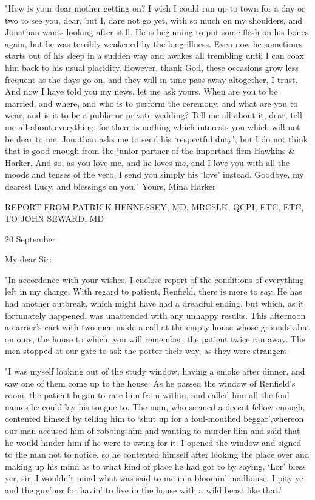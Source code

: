 "How is your dear mother getting on? I wish I could run up to town for a day or two to see you, dear, but I, dare not go yet, with so much on my shoulders, and Jonathan wants looking after still. He is beginning to put some flesh on his bones again, but he was terribly weakened by the long illness. Even now he sometimes starts out of his sleep in a sudden way and awakes all trembling until I can coax him back to his usual placidity. However, thank God, these occasions grow less frequent as the days go on, and they will in time pass away altogether, I trust. And now I have told you my news, let me ask yours. When are you to be married, and where, and who is to perform the ceremony, and what are you to wear, and is it to be a public or private wedding? Tell me all about it, dear, tell me all about everything, for there is nothing which interests you which will not be dear to me. Jonathan asks me to send his `respectful duty', but I do not think that is good enough from the junior partner of the important firm Hawkins \& Harker. And so, as you love me, and he loves me, and I love you with all the moods and tenses of the verb, I send you simply his `love' instead. Goodbye, my dearest Lucy, and blessings on you." Yours, Mina Harker 

REPORT FROM PATRICK HENNESSEY, MD, MRCSLK, QCPI, ETC, ETC, TO JOHN SEWARD, MD 

20 September 

My dear Sir: 

"In accordance with your wishes, I enclose report of the conditions of everything left in my charge. With regard to patient, Renfield, there is more to say. He has had another outbreak, which might have had a dreadful ending, but which, as it fortunately happened, was unattended with any unhappy results. This afternoon a carrier's cart with two men made a call at the empty house whose grounds abut on ours, the house to which, you will remember, the patient twice ran away. The men stopped at our gate to ask the porter their way, as they were strangers. 

"I was myself looking out of the study window, having a smoke after dinner, and saw one of them come up to the house. As he passed the window of Renfield's room, the patient began to rate him from within, and called him all the foul names he could lay his tongue to. The man, who seemed a decent fellow enough, contented himself by telling him to `shut up for a foul-mouthed beggar',whereon our man accused him of robbing him and wanting to murder him and said that he would hinder him if he were to swing for it. I opened the window and signed to the man not to notice, so he contented himself after looking the place over and making up his mind as to what kind of place he had got to by saying, `Lor' bless yer, sir, I wouldn't mind what was said to me in a bloomin' madhouse. I pity ye and the guv'nor for havin' to live in the house with a wild beast like that.' 

